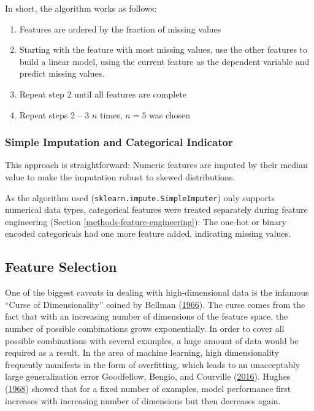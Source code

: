 \documentclass[
  11pt,
  a4paper,
  DIV=12,captions=tableheading,oneside,titlepage]{scrbook}
\providecommand{\tightlist}{%
  \setlength{\itemsep}{0pt}\setlength{\parskip}{0pt}}
\begin{document}
In short, the algorithm works as follows:

\begin{enumerate}
\def\labelenumi{\arabic{enumi}.}
\tightlist
\item
  Features are ordered by the fraction of missing values
\item
  Starting with the feature with most missing values, use the other features to build a linear model, using the current feature as the dependent variable and predict missing values.
\item
  Repeat step 2 until all features are complete
\item
  Repeat steps 2 -- 3 \(n\) times, \(n=5\) was chosen
\end{enumerate}

\hypertarget{simple-imputation-and-categorical-indicator}{%
\subsubsection{Simple Imputation and Categorical Indicator}\label{simple-imputation-and-categorical-indicator}}

This approach is straightforward: Numeric features are imputed by their median value to make the imputation robust to skewed distributions.

As the algorithm used (\texttt{sklearn.impute.SimpleImputer}) only supports numerical data types, categorical features were treated separately during feature engineering (Section \ref{methods-feature-engineering}): The one-hot or binary encoded categoricals had one more feature added, indicating missing values.

\hypertarget{methods-feature-selection}{%
\subsection{Feature Selection}\label{methods-feature-selection}}

One of the biggest caveats in dealing with high-dimensional data is the infamous ``Curse of Dimensionality'' coined by Bellman (\protect\hyperlink{ref-bellman1966dynamic}{1966}). The curse comes from the fact that with an increasing number of dimensions of the feature space, the number of possible combinations grows exponentially. In order to cover all possible combinations with several examples, a huge amount of data would be required as a result. In the area of machine learning, high dimensionality frequently manifests in the form of overfitting, which leads to an unacceptably large generalization error Goodfellow, Bengio, and Courville (\protect\hyperlink{ref-goodfellow2016deep}{2016}). Hughes (\protect\hyperlink{ref-hughes1968mean}{1968}) showed that for a fixed number of examples, model performance first increases with increasing number of dimensions but then decreases again.
\end{document}
